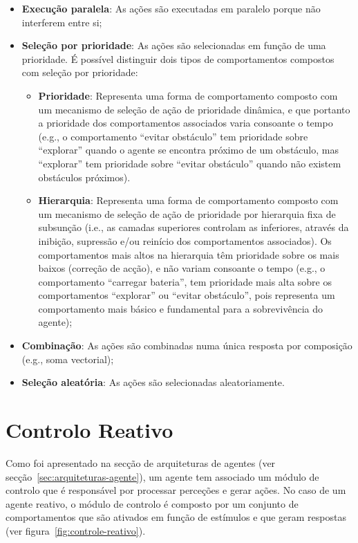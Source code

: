 \begin{itemize}
    \item \textbf{Execução paralela}: As ações são executadas em paralelo porque não interferem entre si;
    \item \textbf{Seleção por prioridade}: As ações são selecionadas em função de uma prioridade.
    É possível distinguir dois tipos de comportamentos compostos com seleção por prioridade:
    \begin{itemize}
        \item \textbf{Prioridade}: Representa uma forma de comportamento composto com um mecanismo de seleção de ação de prioridade dinâmica, e que portanto a prioridade dos comportamentos associados varia consoante o tempo (e.g., o comportamento ``evitar obstáculo'' tem prioridade sobre ``explorar'' quando o agente se encontra próximo de um obstáculo, mas ``explorar'' tem prioridade sobre ``evitar obstáculo'' quando não existem obstáculos próximos).
        \item \textbf{Hierarquia}: Representa uma forma de comportamento composto com um mecanismo de seleção de ação de prioridade por hierarquia fixa de subsunção (i.e., as camadas superiores controlam as inferiores, através da inibição, supressão e/ou reinício dos comportamentos associados).
        Os comportamentos mais altos na hierarquia têm prioridade sobre os mais baixos (correção de acção), e não variam consoante o tempo (e.g., o comportamento ``carregar bateria'', tem prioridade mais alta sobre os comportamentos ``explorar'' ou ``evitar obstáculo'', pois representa um comportamento mais básico e fundamental para a sobrevivência do agente);
    \end{itemize}
    \item \textbf{Combinação}: As ações são combinadas numa única resposta por composição (e.g., soma vectorial);
    \item \textbf{Seleção aleatória}: As ações são selecionadas aleatoriamente.
\end{itemize}


\section{Controlo Reativo}\label{sec:controlo-reativo}

Como foi apresentado na secção de arquiteturas de agentes (ver secção~\ref{sec:arquiteturas-agente}), um agente tem associado um módulo de controlo que é responsável por processar perceções e gerar ações.
No caso de um agente reativo, o módulo de controlo é composto por um conjunto de comportamentos que são ativados em função de estímulos e que geram respostas (ver figura~\ref{fig:controle-reativo}).

